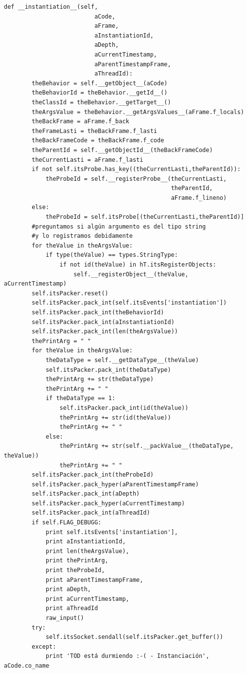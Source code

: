 \documentclass[12pt,legalpaper]{report}
\begin{document}
\begin{singlespace}
\begin{lstlisting}[style=Python]
    def __instantiation__(self, 
                          aCode, 
                          aFrame, 
                          aInstantiationId, 
                          aDepth, 
                          aCurrentTimestamp, 
                          aParentTimestampFrame, 
                          aThreadId):
        theBehavior = self.__getObject__(aCode)
        theBehaviorId = theBehavior.__getId__()
        theClassId = theBehavior.__getTarget__()
        theArgsValue = theBehavior.__getArgsValues__(aFrame.f_locals)
        theBackFrame = aFrame.f_back
        theFrameLasti = theBackFrame.f_lasti
        theBackFrameCode = theBackFrame.f_code
        theParentId = self.__getObjectId__(theBackFrameCode)
        theCurrentLasti = aFrame.f_lasti        
        if not self.itsProbe.has_key((theCurrentLasti,theParentId)):
            theProbeId = self.__registerProbe__(theCurrentLasti,
                                                theParentId,
                                                aFrame.f_lineno)
        else:
            theProbeId = self.itsProbe[(theCurrentLasti,theParentId)]
        #preguntamos si algún argumento es del tipo string
        #y lo registramos debidamente
        for theValue in theArgsValue:
            if type(theValue) == types.StringType:
                if not id(theValue) in hT.itsRegisterObjects:
                    self.__registerObject__(theValue, aCurrentTimestamp)
        self.itsPacker.reset()       
        self.itsPacker.pack_int(self.itsEvents['instantiation'])
        self.itsPacker.pack_int(theBehaviorId)
        self.itsPacker.pack_int(aInstantiationId)
        self.itsPacker.pack_int(len(theArgsValue))
        thePrintArg = " "
        for theValue in theArgsValue:
            theDataType = self.__getDataType__(theValue)               
            self.itsPacker.pack_int(theDataType)
            thePrintArg += str(theDataType)
            thePrintArg += " "
            if theDataType == 1:
                self.itsPacker.pack_int(id(theValue))
                thePrintArg += str(id(theValue))
                thePrintArg += " "
            else:
                thePrintArg += str(self.__packValue__(theDataType, theValue))
                thePrintArg += " "
        self.itsPacker.pack_int(theProbeId)
        self.itsPacker.pack_hyper(aParentTimestampFrame)
        self.itsPacker.pack_int(aDepth)    
        self.itsPacker.pack_hyper(aCurrentTimestamp)
        self.itsPacker.pack_int(aThreadId)
        if self.FLAG_DEBUGG:
            print self.itsEvents['instantiation'],
            print aInstantiationId,
            print len(theArgsValue), 
            print thePrintArg,        
            print theProbeId,
            print aParentTimestampFrame,
            print aDepth,
            print aCurrentTimestamp,
            print aThreadId
            raw_input()
        try:
            self.itsSocket.sendall(self.itsPacker.get_buffer())
        except:
            print 'TOD está durmiendo :-( - Instanciación', aCode.co_name
    

\end{lstlisting}
\end{singlespace}
\end{document}
